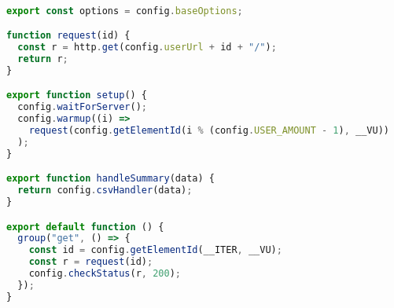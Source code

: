 \begin{lstlisting}[language=JavaScript,caption={K6 Get test},breaklines=true,label={lst:k6Get}]

export const options = config.baseOptions;

function request(id) {
  const r = http.get(config.userUrl + id + "/");
  return r;
}

export function setup() {
  config.waitForServer();
  config.warmup((i) =>
    request(config.getElementId(i % (config.USER_AMOUNT - 1), __VU))
  );
}

export function handleSummary(data) {
  return config.csvHandler(data);
}

export default function () {
  group("get", () => {
    const id = config.getElementId(__ITER, __VU);
    const r = request(id);
    config.checkStatus(r, 200);
  });
}

\end{lstlisting}
